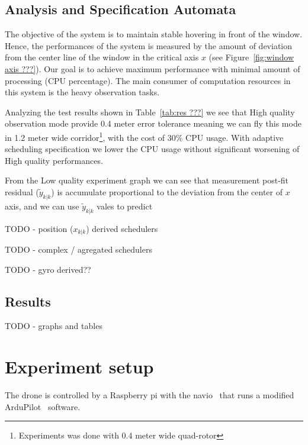 \documentclass{sig-alternate-ipsn13}
\begin{document}


\subsection{Analysis and Specification Automata}

The objective of the system is to maintain stable hovering in front of the window. Hence, the performances of the system is measured by the amount of deviation from the center line of the window in the critical axis $x$ (see Figure~\ref{fig:window axis ???}). Our goal is to achieve maximum performance with minimal amount of processing (CPU percentage). The main consumer of computation resources in this system is the heavy observation tasks.

Analyzing the test results shown in Table~\ref{tab:res ???} we see that High quality observation mode provide 0.4 meter error tolerance meaning we can fly this mode in 1.2 meter wide corridor\footnote{Experiments was done with 0.4 meter wide quad-rotor}, with the cost of 30\% CPU usage. 
With adaptive scheduling specification we lower the CPU usage without significant worsening of High quality performances.

From the Low quality experiment graph we can see that measurement post-fit residual ($\tilde{y}_{k|k}$) is accumulate proportional to the deviation from the center of $x$ axis, and we can use $\tilde{y}_{k|k}$ vales to predict 


TODO - position ($x_{k|k}$)  derived schedulers

TODO - complex / agregated schedulers

TODO - gyro derived??


\subsection{Results}
TODO - graphs and tables

\section{Experiment setup}
The drone is controlled by a Raspberry pi with the navio~\cite{??? raspberry, navio} that runs a modified ArduPilot~\cite{??? APM} software.
\end{document}
